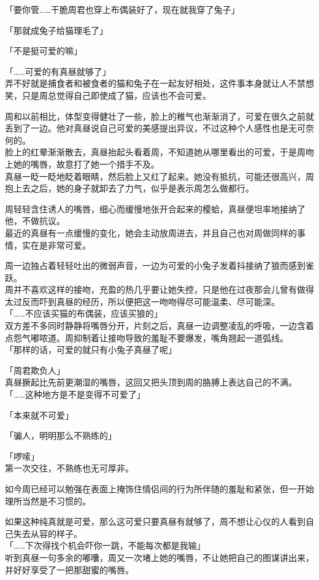 「要你管……干脆周君也穿上布偶装好了，现在就我穿了兔子」

「那就成兔子给猫理毛了」

「不是挺可爱的嘛」

「……可爱的有真昼就够了」\\

弄不好就是捕食者和被食者的猫和兔子在一起友好相处，这件事本身就让人不禁想笑，只是周总觉得自己即使成了猫，应该也不会可爱。

周和以前相比，体型变得健壮了一些，脸上的稚气也渐渐消了，可爱在很久之前就丢到了一边。他对真昼说自己可爱的美感提出异议，不过这种个人感性也是无可奈何的。\\

脸上的红晕渐渐散去，真昼抬起头看着周，不知道她从哪里看出的可爱，于是周吻上她的嘴唇，故意打了她一个措手不及。\\

真昼一眨一眨地眨着眼睛，然后脸上又红了起来。她没有抵抗，可能还很高兴，周抱上去之后，她的身子就卸去了力气，似乎是表示周怎么做都行。

周轻轻含住诱人的嘴唇，细心而缓慢地张开合起来的樱蛤，真昼便坦率地接纳了他，不做抗议。\\

最近的真昼有一点缓慢的变化，她会主动放周进去，并且自己也对周做同样的事情，实在是非常可爱。

周一边独占着轻轻吐出的微弱声音，一边为可爱的小兔子发着抖接纳了狼而感到雀跃。\\

周并不喜欢这样的接吻，充盈的热几乎要让她失控，只是他在过夜那会儿曾有做得太过反而吓到真昼的经历，所以便把这一吻吻得尽可能温柔、尽可能深。\\

「……不应该买猫的布偶装，应该买狼的」\\

双方差不多同时静静将嘴唇分开，片刻之后，真昼一边调整凌乱的呼吸，一边含着点怨气嘟哝道。周抑制着让接吻导致的羞耻不要爆发，嘴角翘起一道弧线。\\

「那样的话，可爱的就只有小兔子真昼了呢」

「周君欺负人」\\

真昼撅起比先前更潮湿的嘴唇，这回又把头顶到周的胳膊上表达自己的不满。\\

「……这种地方是不是变得不可爱了」

「本来就不可爱」

「骗人，明明那么不熟练的」

「啰嗦」\\

第一次交往，不熟练也无可厚非。

如今周已经可以勉强在表面上掩饰住情侣间的行为所伴随的羞耻和紧张，但一开始理所当然是不习惯的。

如果这种纯真就是可爱，那么这可爱只要真昼有就够了，周不想让心仪的人看到自己失去从容的样子。\\

「……下次得找个机会吓你一跳，不能每次都是我输」\\

听到真昼一句多余的嘟囔，周又一次堵上她的嘴唇，不让她把自己的图谋讲出来，并好好享受了一把那甜蜜的嘴唇。
